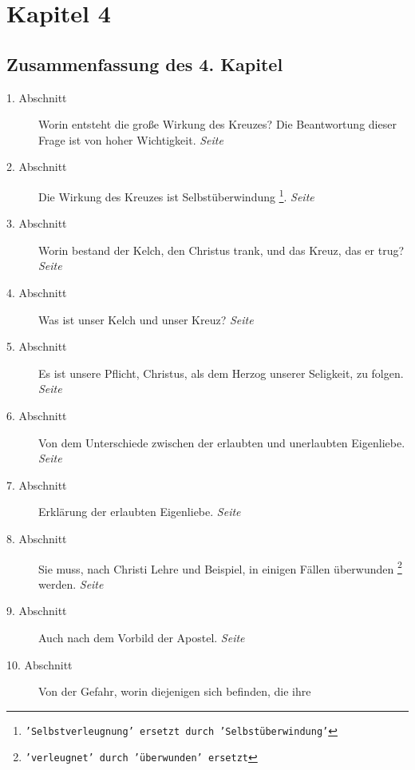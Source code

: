 

\chapter{Kapitel 4} \label{kap4}

\section{Zusammenfassung des 4. Kapitel}

\begin{description}
\item[1. Abschnitt] Worin entsteht die große Wirkung des Kreuzes? Die
Beantwortung dieser Frage ist von hoher Wichtigkeit.
\dotfill \textit{Seite~\pageref{kap4_ab1}}\\
\item[2. Abschnitt] Die Wirkung des Kreuzes ist Selbstüberwindung
\footnote{\texttt{'Selbstverleugnung' ersetzt durch 'Selbstüberwindung'}}.
\dotfill \textit{Seite~\pageref{kap4_ab2}}\\
\item[3. Abschnitt] Worin bestand der Kelch, den Christus trank, und das Kreuz,
das er trug?
\dotfill \textit{Seite~\pageref{kap4_ab3}}\\
\item[4. Abschnitt]  Was ist unser Kelch und unser Kreuz?
\dotfill \textit{Seite~\pageref{kap4_ab4}}\\
\item[5. Abschnitt] Es ist unsere Pflicht, Christus, als dem Herzog unserer
Seligkeit, zu folgen.
\dotfill \textit{Seite~\pageref{kap4_ab5}}\\
\item[6. Abschnitt] Von dem Unterschiede zwischen der erlaubten und unerlaubten
Eigenliebe.
\dotfill \textit{Seite~\pageref{kap4_ab6}}\\
\item[7. Abschnitt] Erklärung der erlaubten Eigenliebe.
\dotfill \textit{Seite~\pageref{kap4_ab7}}\\
\item[8. Abschnitt] Sie muss, nach Christi Lehre und Beispiel, in einigen Fällen
überwunden \footnote{\texttt{'verleugnet' durch 'überwunden' ersetzt}} werden.
\dotfill \textit{Seite~\pageref{kap4_ab8}}\\
\item[9. Abschnitt] Auch nach dem Vorbild der Apostel.
\dotfill \textit{Seite~\pageref{kap4_ab9}}\\
\item[10. Abschnitt] Von der Gefahr, worin diejenigen sich befinden, die ihre

\end{description}
